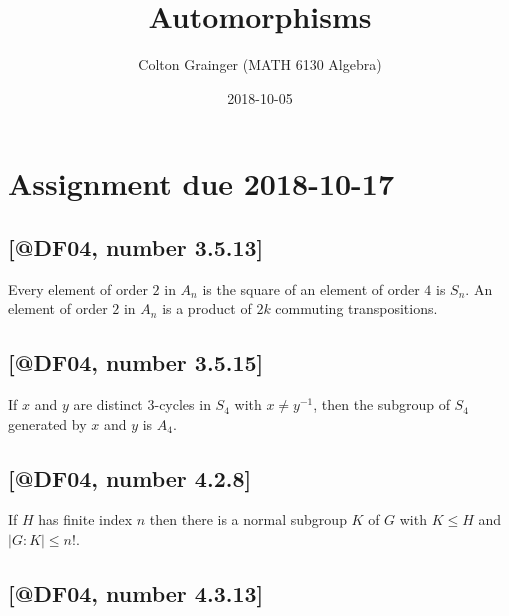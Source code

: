 \documentclass{humanist}
\title{Automorphisms}
\author{Colton Grainger (MATH 6130 Algebra)}
\date{2018-10-05}
\let\subsubsection\subsection
\let\subsection\section
\let\section\chapter
\let\chapter\part
\providecommand{\abs}[1]{\left\lvert #1 \right\rvert}
\begin{document}
\maketitle

\providecommand{\Aut}[1]{\mathrm{Aut}\left({ #1 }\right)}

\setcounter{section}{5}

\hypertarget{assignment-due-2018-10-17}{%
\subsection{Assignment due 2018-10-17}\label{assignment-due-2018-10-17}}

\hypertarget{number-3.5.13df04-number-3.5.13}{%
\subsubsection{\texorpdfstring{{[}@DF04, number
3.5.13{]}}{, number 3.5.13{[}@DF04, number 3.5.13{]}}}\label{number-3.5.13df04-number-3.5.13}}

Every element of order \(2\) in \(A_n\) is the square of an element of
order \(4\) is \(S_n\). An element of order \(2\) in \(A_n\) is a
product of \(2k\) commuting transpositions.

\hypertarget{number-3.5.15df04-number-3.5.15}{%
\subsubsection{\texorpdfstring{{[}@DF04, number
3.5.15{]}}{, number 3.5.15{[}@DF04, number 3.5.15{]}}}\label{number-3.5.15df04-number-3.5.15}}

If \(x\) and \(y\) are distinct \(3\)-cycles in \(S_4\) with
\(x \neq y^{-1}\), then the subgroup of \(S_4\) generated by \(x\) and
\(y\) is \(A_4\).

\hypertarget{number-4.2.8df04-number-4.2.8}{%
\subsubsection{\texorpdfstring{{[}@DF04, number
4.2.8{]}}{, number 4.2.8{[}@DF04, number 4.2.8{]}}}\label{number-4.2.8df04-number-4.2.8}}

If \(H\) has finite index \(n\) then there is a normal subgroup \(K\) of
\(G\) with \(K \le H\) and \(\abs{G : K} \le n!\).

\hypertarget{number-4.3.13df04-number-4.3.13}{%
\subsubsection{\texorpdfstring{{[}@DF04, number
4.3.13{]}}{, number 4.3.13{[}@DF04, number 4.3.13{]}}}\label{number-4.3.13df04-number-4.3.13}}
\end{document}
